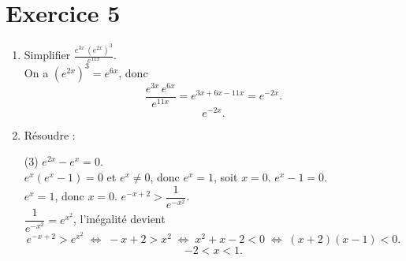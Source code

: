 \documentclass{article}
\theoremstyle{definition}
\begin{document}
\section*{Exercice 5}
\begin{enumerate}
  \item Simplifier 
  \(\displaystyle \frac{e^{3x}\,(e^{2x})^3}{e^{11x}}\).\\
  On a \((e^{2x})^3 = e^{6x}\), donc
  \[
    \frac{e^{3x}\,e^{6x}}{e^{11x}}
    = e^{3x+6x-11x}
    = e^{-2x}.
  \]
  \[
    \boxed{e^{-2x}.}
  \]
  \item Résoudre :
  \begin{tasks}(3)
    \task \(e^{2x}-e^x=0\).\\
      \(e^x(e^x-1)=0\) et \(e^x\neq0\), donc \(e^x=1\), soit \(x=0\).
    \task \(e^x-1=0\).\\
      \(e^x=1\), donc \(x=0\).
    \task \(e^{-x+2}>\dfrac1{e^{-x^2}}\).\\
      \(\dfrac1{e^{-x^2}}=e^{x^2}\), l’inégalité devient
      \[
        e^{-x+2}>e^{x^2}
        \;\Longleftrightarrow\;
        -x+2 > x^2
        \;\Longleftrightarrow\;
        x^2 + x - 2 < 0
        \;\Longleftrightarrow\;
        (x+2)(x-1)<0.
      \]
      \[
        \boxed{-2 < x < 1.}
      \]
  \end{tasks}
\end{enumerate}
\end{document}
